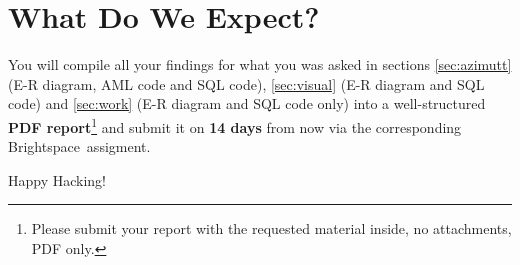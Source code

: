 \documentclass{article}
\begin{document}
\section{What Do We Expect?}
You will compile all your findings for what you was asked in sections \ref{sec:azimutt} (E-R diagram, AML code and SQL code), \ref{sec:visual} (E-R diagram and SQL code) and \ref{sec:work} (E-R diagram and SQL code only) into a well-structured \textbf{PDF report}\footnote{Please submit your report with the requested material inside, no attachments, PDF only.} and submit it on \textbf{14 days} from now via the corresponding Brightspace\texttrademark ~assigment.

\vspace{5mm}
Happy Hacking! 
\end{document}
